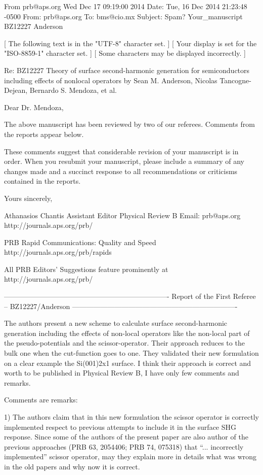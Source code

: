 From prb@aps.org Wed Dec 17 09:19:00 2014
Date: Tue, 16 Dec 2014 21:23:48 -0500
From: prb@aps.org
To: bms@cio.mx
Subject: {Spam?} Your_manuscript BZ12227 Anderson

    [ The following text is in the "UTF-8" character set. ]
    [ Your display is set for the "ISO-8859-1" character set.  ]
    [ Some characters may be displayed incorrectly. ]

Re: BZ12227
    Theory of surface second-harmonic generation for  semiconductors
    including effects of nonlocal operators
    by Sean M. Anderson, Nicolas Tancogne-Dejean, Bernardo S. Mendoza, et
    al.

Dear Dr. Mendoza,

The above manuscript has been reviewed by two of our referees. Comments
from the reports appear below.

These comments suggest that considerable revision of your manuscript is
in order. When you resubmit your manuscript, please include a summary
of any changes made and a succinct response to all recommendations or
criticisms contained in the reports.

Yours sincerely,

Athanasios Chantis
Assistant Editor
Physical Review B
Email: prb@aps.org
http://journals.aps.org/prb/

PRB Rapid Communications: Quality and Speed
http://journals.aps.org/prb/rapids

All PRB Editors' Suggestions feature prominently at
http://journals.aps.org/prb/

----------------------------------------------------------------------
Report of the First Referee -- BZ12227/Anderson
----------------------------------------------------------------------

The authors present a new scheme to calculate surface second-harmonic 
generation including the effects of non-local operators like the 
non-local part of the pseudo-potentials and the scissor-operator. 
Their approach reduces to the bulk one when the cut-function goes to 
one. They validated their new formulation on a clear example the 
Si(001)2x1 surface. I think their approach is correct and worth to be 
published in Physical Review B, I have only few comments and remarks. 

Comments are remarks: 

1) The authors claim that in this new formulation the scissor operator 
is correctly implemented respect to previous attempts to include it in 
the surface SHG response. Since some of the authors of the present 
paper are also author of the previous approaches (PRB 63, 2054406; PRB 
74, 075318) that “... incorrectly implemented” scissor operator, may 
they explain more in details what was wrong in the old papers and why 
now it is correct. 

